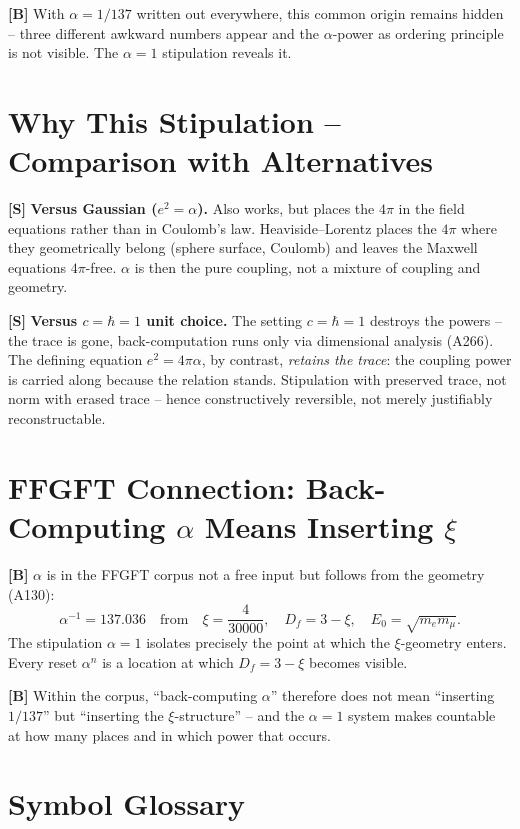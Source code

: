 \textbf{[B]} With $\alpha=1/137$ written out everywhere, this common origin
remains hidden -- three different awkward numbers appear and the $\alpha$-power
as ordering principle is not visible. The $\alpha=1$ stipulation reveals it.

\section{Why This Stipulation -- Comparison with Alternatives}

\textbf{[S]} \textbf{Versus Gaussian ($e^2=\alpha$).} Also works, but places the
$4\pi$ in the field equations rather than in Coulomb's law. Heaviside--Lorentz
places the $4\pi$ where they geometrically belong (sphere surface, Coulomb) and
leaves the Maxwell equations $4\pi$-free. $\alpha$ is then the pure coupling, not
a mixture of coupling and geometry.

\textbf{[S]} \textbf{Versus $c=\hbar=1$ unit choice.} The setting $c=\hbar=1$
destroys the powers -- the trace is gone, back-computation runs only via
dimensional analysis (A266). The defining equation $e^2=4\pi\alpha$, by contrast,
\emph{retains the trace}: the coupling power is carried along because the relation
stands. Stipulation with preserved trace, not norm with erased trace -- hence
constructively reversible, not merely justifiably reconstructable.

\section{FFGFT Connection: Back-Computing $\alpha$ Means Inserting $\xi$}

\textbf{[B]} $\alpha$ is in the FFGFT corpus not a free input but follows from
the geometry (A130):
\[
  \alpha^{-1} = 137{.}036 \quad\text{from}\quad \xi = \frac{4}{30000},
  \quad D_f = 3-\xi, \quad E_0=\sqrt{m_em_\mu}.
\]
The stipulation $\alpha=1$ isolates precisely the point at which the $\xi$-geometry
enters. Every reset $\alpha^n$ is a location at which $D_f=3-\xi$ becomes visible.

\textbf{[B]} Within the corpus, ``back-computing $\alpha$'' therefore does not
mean ``inserting $1/137$'' but ``inserting the $\xi$-structure'' -- and the
$\alpha{=}1$ system makes countable at how many places and in which power that
occurs.

\section{Symbol Glossary}

